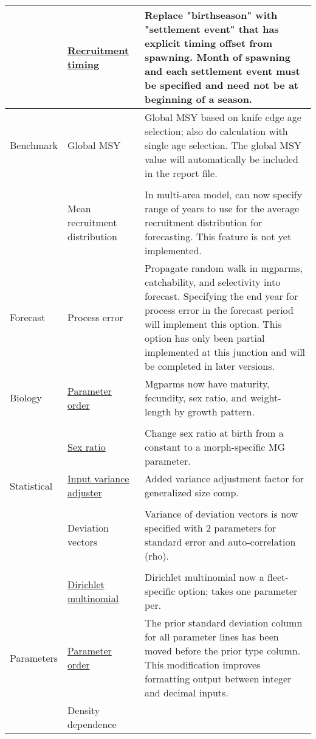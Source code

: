 \documentclass[12pt]{article}
\begin{document}
\begin{center}
\begin{longtable}{p{2cm} p{3cm} p{10cm}}
		\\
		& \hyperlink{RecrTiming}{Recruitment timing} & 
		Replace "birthseason" with "settlement event" that has explicit timing offset from spawning.  Month of spawning and each settlement event must be specified and need not be at beginning of a season.\\
		\hline
		Benchmark 
		& Global MSY &  
		Global MSY based on knife edge age selection; also do calculation with single age selection. The global MSY value will automatically be included in the report file.\\
		\\					
		& Mean recruitment distribution & 
		In multi-area model, can now specify range of years to use for the average recruitment distribution for forecasting. This feature is not yet implemented. \\
		\hline
		Forecast & 
		Process error & 
		Propagate random walk in mgparms, catchability, and selectivity into forecast. Specifying the end year for process error in the forecast period will implement this option.  This option has only been partial implemented at this junction and will be completed in later versions.\\
		\hline
		Biology 
		& \hyperlink{MGorder}{Parameter order} & 
		Mgparms now have maturity, fecundity, sex ratio, and weight-length by growth pattern.\\
		\\						
		& \hyperlink{SexRatio}{Sex ratio} & 
		Change sex ratio at birth from a constant to a morph-specific MG parameter. \\
		\hline
		Statistical 
		& \hyperlink{GcompVar}{Input variance adjuster} & 
		Added variance adjustment factor for generalized size comp. \\
		\\						
		& Deviation vectors & 
		Variance of deviation vectors is now specified with 2 parameters for standard error and auto-correlation (rho).\\
		\\						
		& \hyperlink{Dirichlet}{Dirichlet multinomial} & 
		Dirichlet multinomial now a fleet-specific option; takes one parameter per. \\
		\hline
		Parameters 
		& \hyperlink{paraOrder}{Parameter order} & The prior standard deviation column for all parameter lines has been moved before the prior type column.  This modification improves formatting output between integer and decimal inputs.\\ 
		& Density dependence & 

\end{longtable}
\end{center}
\end{document}
